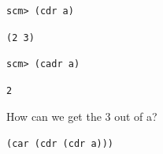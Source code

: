 \begin{lstlisting}
scm> (cdr a)
\end{lstlisting}
\begin{solution}[.25in]
\begin{lstlisting}
(2 3)
\end{lstlisting}
\end{solution}

\begin{lstlisting}
scm> (cadr a)
\end{lstlisting}
\begin{solution}[.25in]
\begin{lstlisting}
2
\end{lstlisting}
\end{solution}

How can we get the 3 out of a?
\begin{solution}[.25in]
\begin{lstlisting}
(car (cdr (cdr a)))
\end{lstlisting}
\end{solution}
